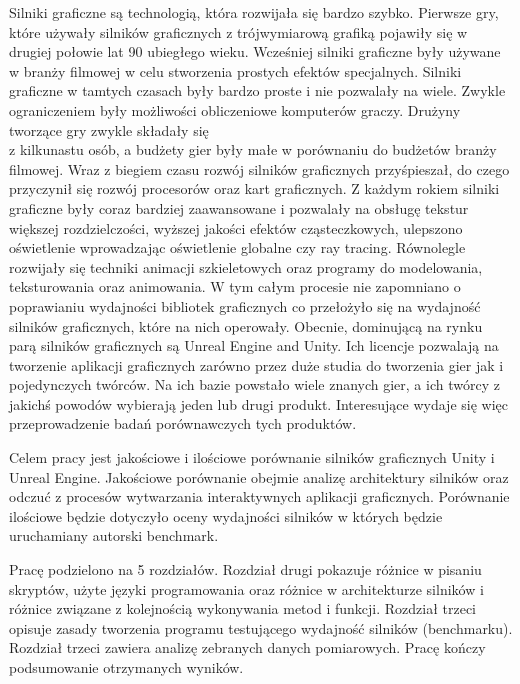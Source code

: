 \documentclass[12pt,twoside]{article}
\begin{document}
Silniki graficzne są technologią, która rozwijała się bardzo szybko. Pierwsze gry, które używały
silników graficznych z trójwymiarową grafiką pojawiły się w drugiej połowie lat 90 ubiegłego wieku.
Wcześniej silniki graficzne były używane w branży filmowej w celu stworzenia prostych efektów
specjalnych. Silniki graficzne w tamtych czasach były bardzo proste i nie pozwalały na wiele. Zwykle
ograniczeniem były możliwości obliczeniowe komputerów graczy. Drużyny tworzące gry zwykle
składały się\\z kilkunastu osób, a budżety gier były małe w porównaniu do budżetów branży filmowej.
Wraz z biegiem czasu rozwój silników graficznych przyśpieszał, do czego przyczynił się rozwój
procesorów oraz kart graficznych. Z każdym rokiem silniki graficzne były coraz bardziej
zaawansowane i pozwalały na obsługę tekstur większej rozdzielczości, wyższej jakości efektów
cząsteczkowych, ulepszono oświetlenie wprowadzając oświetlenie globalne czy ray tracing.
Równolegle rozwijały się techniki animacji szkieletowych oraz programy do modelowania,
teksturowania oraz animowania. W tym całym procesie nie zapomniano o poprawianiu wydajności
bibliotek graficznych co przełożyło się na wydajność silników graficznych, które na nich operowały.
Obecnie, dominującą na rynku parą silników graficznych są Unreal Engine and Unity. Ich licencje
pozwalają na tworzenie aplikacji graficznych zarówno przez duże studia do tworzenia gier jak
i pojedynczych twórców. Na ich bazie powstało wiele znanych gier, a ich twórcy z jakichś powodów
wybierają jeden lub drugi produkt. Interesujące wydaje się więc przeprowadzenie badań
porównawczych tych produktów.

Celem pracy jest jakościowe i ilościowe porównanie silników graficznych Unity i Unreal Engine.
Jakościowe porównanie obejmie analizę architektury silników oraz odczuć z procesów wytwarzania
interaktywnych aplikacji graficznych. Porównanie ilościowe będzie dotyczyło oceny wydajności
silników w których będzie uruchamiany autorski benchmark.

Pracę podzielono na 5 rozdziałów. Rozdział drugi pokazuje różnice w pisaniu skryptów, użyte języki
programowania oraz różnice w architekturze silników i różnice związane z kolejnością wykonywania
metod i funkcji. Rozdział trzeci opisuje zasady tworzenia programu testującego wydajność silników
(benchmarku). Rozdział trzeci zawiera analizę zebranych danych pomiarowych. Pracę kończy
podsumowanie otrzymanych wyników.


\clearpage
\end{document}
